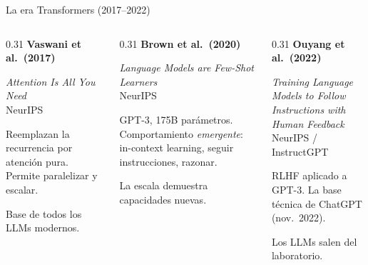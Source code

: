 \documentclass[aspectratio=169, 11pt]{beamer}
\begin{document}
\begin{frame}{La era Transformers (2017--2022)}

\begin{columns}[T]
\begin{column}{0.31\textwidth}
\textbf{Vaswani et al.\ (2017)}

\vspace{0.2em}
\textit{\scriptsize Attention Is All You Need} \\ {\scriptsize NeurIPS}

\vspace{0.4em}
\footnotesize
Reemplazan la recurrencia por atenci\'on pura. Permite paralelizar y escalar.

\vspace{0.4em}
\alert{Base de todos los LLMs modernos.}
\end{column}

\begin{column}{0.31\textwidth}
\textbf{Brown et al.\ (2020)}

\vspace{0.2em}
\textit{\scriptsize Language Models are Few-Shot Learners} \\ {\scriptsize NeurIPS}

\vspace{0.4em}
\footnotesize
GPT-3, 175B par\'ametros. Comportamiento \emph{emergente}: in-context learning, seguir instrucciones, razonar.

\vspace{0.4em}
\alert{La escala demuestra capacidades nuevas.}
\end{column}

\begin{column}{0.31\textwidth}
\textbf{Ouyang et al.\ (2022)}

\vspace{0.2em}
\textit{\scriptsize Training Language Models to Follow Instructions with Human Feedback} \\ {\scriptsize NeurIPS / InstructGPT}

\vspace{0.4em}
\footnotesize
RLHF aplicado a GPT-3. La base t\'ecnica de ChatGPT (nov.\ 2022).

\vspace{0.4em}
\alert{Los LLMs salen del laboratorio.}
\end{column}
\end{columns}

\end{frame}
\end{document}

